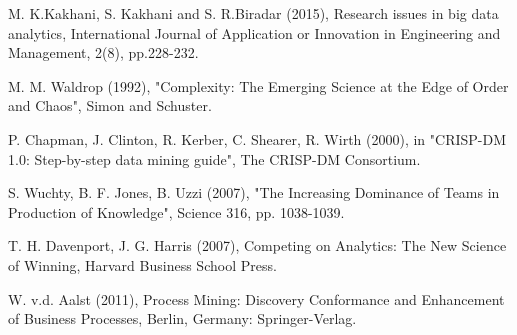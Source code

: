 \documentclass[a4paper]{article}
\begin{document}
\begin{multicols}{2}
\begin{thebibliography}{}
\bibitem M. K.Kakhani, S. Kakhani and S. R.Biradar (2015), Research issues in big data analytics, International Journal of Application or Innovation in Engineering and Management, 2(8), pp.228-232.

\bibitem M. M. Waldrop (1992), "Complexity: The Emerging Science at the Edge of Order and Chaos", Simon and Schuster.

\bibitem P. Chapman, J. Clinton, R. Kerber, C. Shearer, R. Wirth (2000),
in "CRISP-DM 1.0: Step-by-step data mining guide", The
CRISP-DM Consortium.

\bibitem S. Wuchty, B. F. Jones, B. Uzzi (2007), "The Increasing
Dominance of Teams in Production of Knowledge", Science
316, pp. 1038-1039.

\bibitem T. H. Davenport, J. G. Harris (2007), Competing on Analytics:
The New Science of Winning, Harvard Business School Press.

\bibitem W. v.d. Aalst (2011), Process Mining: Discovery Conformance
and Enhancement of Business Processes, Berlin, Germany:
Springer-Verlag.
\end{thebibliography} 
\end{multicols}
\end{document}
